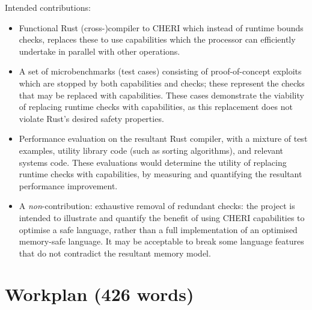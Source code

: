 \documentclass[11pt]{article}
\begin{document}
Intended contributions:
\begin{itemize}
  \item Functional Rust (cross-)compiler to CHERI which instead of runtime bounds checks, replaces these to use capabilities which the processor can efficiently undertake in parallel with other operations.
  \item A set of microbenchmarks (test cases) consisting of proof-of-concept exploits which are stopped by both capabilities and checks; these represent the checks that may be replaced with capabilities.
  These cases demonstrate the viability of replacing runtime checks with capabilities, as this replacement does not violate Rust's desired safety properties.
  \item Performance evaluation on the resultant Rust compiler, with a mixture of test examples, utility library code (such as sorting algorithms), and relevant systems code.
  These evaluations would determine the utility of replacing runtime checks with capabilities, by measuring and quantifying the resultant performance improvement.
  \item A \emph{non}-contribution: exhaustive removal of redundant checks: the project is intended to illustrate and quantify the benefit of using CHERI capabilities to optimise a safe language, rather than a full implementation of an optimised memory-safe language. It may be acceptable to break some language features that do not contradict the resultant memory model.
\end{itemize}

\section{Workplan (426 words)}
\end{document}
